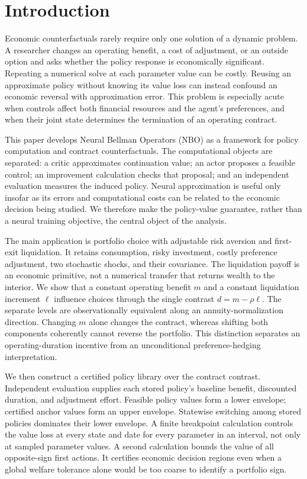 \section{Introduction}
Economic counterfactuals rarely require only one solution of a dynamic problem. A researcher changes an operating benefit, a cost of adjustment, or an outside option and asks whether the policy response is economically significant. Repeating a numerical solve at each parameter value can be costly. Reusing an approximate policy without knowing its value loss can instead confound an economic reversal with approximation error. This problem is especially acute when controls affect both financial resources and the agent's preferences, and when their joint state determines the termination of an operating contract.

This paper develops Neural Bellman Operators (NBO) as a framework for policy computation and contract counterfactuals. The computational objects are separated: a critic approximates continuation value; an actor proposes a feasible control; an improvement calculation checks that proposal; and an independent evaluation measures the induced policy. Neural approximation is useful only insofar as its errors and computational costs can be related to the economic decision being studied. We therefore make the policy-value guarantee, rather than a neural training objective, the central object of the analysis.

The main application is portfolio choice with adjustable risk aversion and first-exit liquidation. It retains consumption, risky investment, costly preference adjustment, two stochastic shocks, and their covariance. The liquidation payoff is an economic primitive, not a numerical transfer that returns wealth to the interior. We show that a constant operating benefit $m$ and a constant liquidation increment $\ell$ influence choices through the single contrast $d=m-\rho\ell$. The separate levels are observationally equivalent along an annuity-normalization direction. Changing $m$ alone changes the contract, whereas shifting both components coherently cannot reverse the portfolio. This distinction separates an operating-duration incentive from an unconditional preference-hedging interpretation.

We then construct a certified policy library over the contract contrast. Independent evaluation supplies each stored policy's baseline benefit, discounted duration, and adjustment effort. Feasible policy values form a lower envelope; certified anchor values form an upper envelope. Statewise switching among stored policies dominates their lower envelope. A finite breakpoint calculation controls the value loss at every state and date for every parameter in an interval, not only at sampled parameter values. A second calculation bounds the value of all opposite-sign first actions. It certifies economic decision regions even when a global welfare tolerance alone would be too coarse to identify a portfolio sign.

